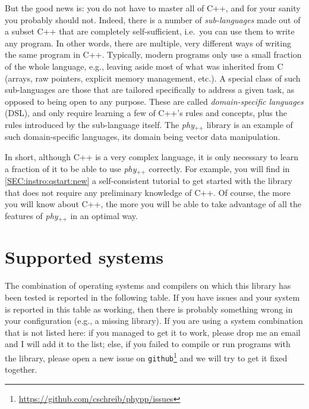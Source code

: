 \documentclass[12pt]{report}
\newcommand{\phypp}{\textit{phy}$_{\text{++}}$\xspace}
\begin{document}
But the good news is: you do not have to master all of C++, and for your sanity you probably should not. Indeed, there is a number of \emph{sub-languages} made out of a subset C++ that are completely self-sufficient, i.e.~you can use them to write any program. In other words, there are multiple, very different ways of writing the same program in C++. Typically, modern programs only use a small fraction of the whole language, e.g., leaving aside most of what was inherited from C (arrays, raw pointers, explicit memory management, etc.). A special class of such sub-languages are those that are tailored specifically to address a given task, as opposed to being open to any purpose. These are called \emph{domain-specific languages} (DSL), and only require learning a few of C++'s rules and concepts, plus the rules introduced by the sub-language itself. The \phypp library is an example of such domain-specific languages, its domain being vector data manipulation.

In short, although C++ is a very complex language, it is only necessary to learn a fraction of it to be able to use \phypp correctly. For example, you will find in \ref{SEC:instro:qstart:new} a self-consistent tutorial to get started with the library that does not require any preliminary knowledge of C++. Of course, the more you will know about C++, the more you will be able to take advantage of all the features of \phypp in an optimal way.

\section{Supported systems \label{SEC:intro:supported}}

The combination of operating systems and compilers on which this library has been tested is reported in the following table. If you have issues and your system is reported in this table as working, then there is probably something wrong in your configuration (e.g., a missing library). If you are using a system combination that is not listed here: if you managed to get it to work, please drop me an email and I will add it to the list; else, if you failed to compile or run programs with the library, please open a new issue on \texttt{github}\footnote{\url{https://github.com/cschreib/phypp/issues}} and we will try to get it fixed together.
\end{document}
